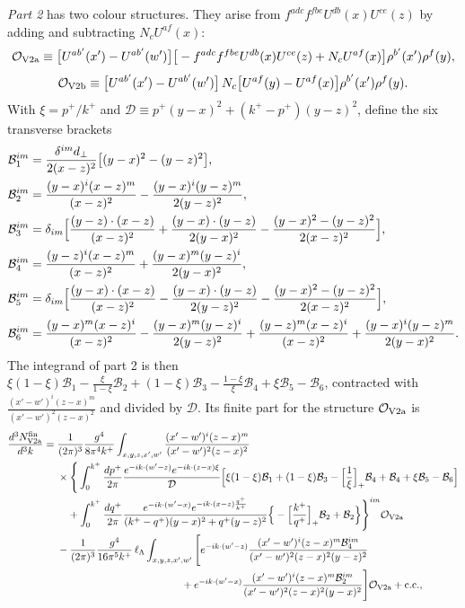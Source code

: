 \documentclass[aps,prd,onecolumn,superscriptaddress,nofootinbib,floatfix,longbibliography,11pt]{revtex4-2}
\numberwithin{equation}{section}
\newcommand{\lL}{\ell_{\Lambda}}
\newcommand{\Ord}{\mathcal{O}}
\begin{document}
\emph{Part 2} has two colour structures. They arise from $f^{adc}f^{fbe}U^{db}(x)U^{ce}(z)$ by adding and subtracting $N_cU^{af}(x)$:
\begin{equation}
\Ord_{\rm V2a}\equiv\big[U^{ab'}(x')-U^{ab'}(w')\big]\big[-f^{adc}f^{fbe}U^{db}(x)U^{ce}(z)+N_cU^{af}(x)\big]\rho^{b'}(x')\rho^f(y),
\end{equation}
\begin{equation}
\Ord_{\rm V2b}\equiv\big[U^{ab'}(x')-U^{ab'}(w')\big]\,N_c\big[U^{af}(y)-U^{af}(x)\big]\rho^{b'}(x')\rho^f(y).
\end{equation}
With $\xi=p^+/k^+$ and $\mathcal D\equiv p^+(y-x)^2+(k^+-p^+)(y-z)^2$, define the six transverse brackets
\begin{align}
\mathcal B_1^{im}&=\frac{\delta^{im}d_\perp}{2(x-z)^2}\big[(y-x)^2-(y-z)^2\big],\notag\\
\mathcal B_2^{im}&=\frac{(y-x)^i(x-z)^m}{(x-z)^2}-\frac{(y-x)^i(y-z)^m}{2(y-z)^2},\notag\\
\mathcal B_3^{im}&=\delta_{im}\Big[\frac{(y-z)\cdot(x-z)}{(x-z)^2}+\frac{(y-x)\cdot(y-z)}{2(y-x)^2}-\frac{(y-x)^2-(y-z)^2}{2(x-z)^2}\Big],\notag\\
\mathcal B_4^{im}&=\frac{(y-z)^i(x-z)^m}{(x-z)^2}+\frac{(y-x)^m(y-z)^i}{2(y-x)^2},\notag\\
\mathcal B_5^{im}&=\delta_{im}\Big[\frac{(y-x)\cdot(x-z)}{(x-z)^2}-\frac{(y-x)\cdot(y-z)}{2(y-z)^2}-\frac{(y-x)^2-(y-z)^2}{2(x-z)^2}\Big],\notag\\
\mathcal B_6^{im}&=\frac{(y-x)^m(x-z)^i}{(x-z)^2}-\frac{(y-x)^m(y-z)^i}{2(y-z)^2}+\frac{(y-z)^m(x-z)^i}{(x-z)^2}+\frac{(y-x)^i(y-z)^m}{2(y-x)^2}.
\label{eq:B16}
\end{align}
The integrand of part 2 is then $\xi(1-\xi)\mathcal B_1-\frac{\xi}{1-\xi}\mathcal B_2+(1-\xi)\mathcal B_3-\frac{1-\xi}{\xi}\mathcal B_4+\xi\mathcal B_5-\mathcal B_6$, contracted with $\frac{(x'-w')^i(z-x)^m}{(x'-w')^2(z-x)^2}$ and divided by $\mathcal D$. Its finite part for the structure $\Ord_{\rm V2a}$ is
\begin{align}
\frac{d^3N^{\rm fin}_{\rm V2a}}{d^3k}={}&\frac{1}{(2\pi)^3}\frac{g^4}{8\pi^4k^+}\int_{x,y,z,x',w'}\frac{(x'-w')^i(z-x)^m}{(x'-w')^2(z-x)^2}\notag\\
&\times\Bigg\{\int_0^{k^+}\frac{dp^+}{2\pi}\frac{e^{-ik\cdot(w'-z)}e^{-ik\cdot(z-x)\xi}}{\mathcal D}\Big[\xi(1-\xi)\mathcal B_1+(1-\xi)\mathcal B_3-\Big[\frac1\xi\Big]_+\mathcal B_4+\mathcal B_4+\xi\mathcal B_5-\mathcal B_6\Big]\notag\\
&\quad+\int_0^{k^+}\frac{dq^+}{2\pi}\frac{e^{-ik\cdot(w'-x)}e^{-ik\cdot(x-z)\frac{q^+}{k^+}}}{(k^+-q^+)(y-x)^2+q^+(y-z)^2}\Big\{-\Big[\frac{k^+}{q^+}\Big]_+\mathcal B_2+\mathcal B_2\Big\}\Bigg\}^{im}\Ord_{\rm V2a}\notag\\
&-\frac{1}{(2\pi)^3}\frac{g^4}{16\pi^5k^+}\,\lL\int_{x,y,z,x',w'}\Bigg[e^{-ik\cdot(w'-z)}\frac{(x'-w')^i(z-x)^m\mathcal B_4^{im}}{(x'-w')^2(z-x)^2(y-z)^2}\notag\\
&\hspace{12em}+e^{-ik\cdot(w'-x)}\frac{(x'-w')^i(z-x)^m\mathcal B_2^{im}}{(x'-w')^2(z-x)^2(y-x)^2}\Bigg]\Ord_{\rm V2a}+{\rm c.c.},
\label{eq:finV2a}
\end{align}
\end{document}
